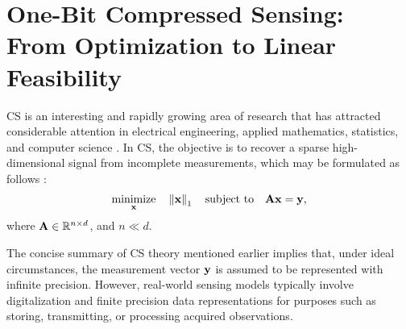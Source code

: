 \documentclass[12pt,draftcls,onecolumn]{IEEEtran}
\begin{document}
\section{One-Bit Compressed Sensing:\\ 
From Optimization to Linear Feasibility}
CS is an interesting and rapidly growing area of research that has attracted considerable attention in electrical engineering, applied mathematics, statistics, and computer science \cite{eldar2012compressed,davenport2016overview}. In CS, 
the objective is to recover a sparse high-dimensional signal from incomplete measurements, which may be formulated as follows \cite{eldar2012compressed}:
\begin{equation}
\label{eq:1nnnnnnnm}
\begin{aligned}
\underset{\mbx}{\textrm{minimize}}\quad \left\|\mathbf{x}\right\|_{1}\quad
\text{subject to}\quad \mbA\mathbf{x}=\mathbf{y},
\end{aligned}
\end{equation}
where $\mathbf{A}\in\mathbb{R}^{n\times d}$, and $n\ll d$. 

The concise summary of CS theory mentioned earlier implies that, under ideal circumstances, the measurement vector $\mathbf{y}$ is assumed to be represented with infinite precision. However, real-world sensing models typically involve digitalization and finite precision data representations for purposes such as storing, transmitting, or processing acquired observations.
\end{document}
